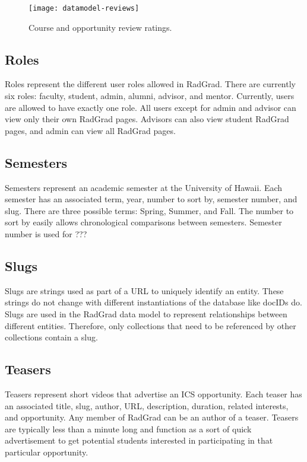 \begin{figure}[h]
\centering
\texttt{[image: datamodel-reviews]}
\caption{Course and opportunity review ratings.}
\end{figure}

\subsection{Roles}
Roles represent the different user roles allowed in RadGrad. There are currently six roles: faculty, student, admin, alumni, advisor, and mentor. Currently, users are allowed to have exactly one role. All users except for admin and advisor can view only their own RadGrad pages. Advisors can also view student RadGrad pages, and admin can view all RadGrad pages. 

\subsection{Semesters}
Semesters represent an academic semester at the University of Hawaii. Each semester has an associated term, year, number to sort by, semester number, and slug. There are three possible terms: Spring, Summer, and Fall. The number to sort by easily allows chronological comparisons between semesters. Semester number is used for ??? 

\subsection{Slugs}
Slugs are strings used as part of a URL to uniquely identify an entity. These strings do not change with different instantiations of the database like docIDs do. Slugs are used in the RadGrad data model to represent relationships between different entities. Therefore, only collections that need to be referenced by other collections contain a slug. 

\subsection{Teasers}
Teasers represent short videos that advertise an ICS opportunity. Each teaser has an associated title, slug, author, URL, description, duration, related interests, and opportunity. Any member of RadGrad can be an author of a teaser. Teasers are typically less than a minute long and function as a sort of quick advertisement to get potential students interested in participating in that particular opportunity. 

